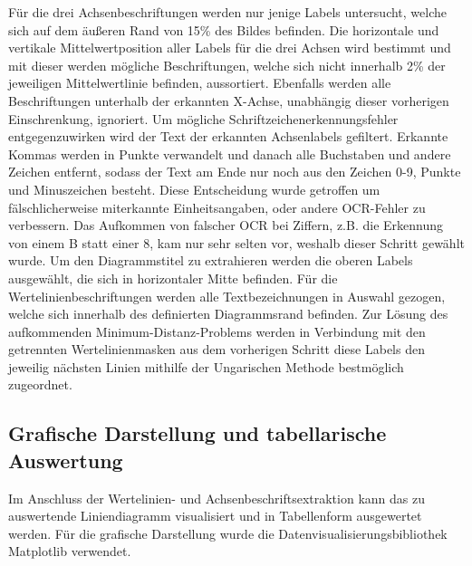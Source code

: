 Für die drei Achsenbeschriftungen werden nur jenige Labels untersucht, welche sich auf dem äußeren Rand von 15\% des Bildes befinden. Die horizontale und vertikale Mittelwertposition aller Labels für die drei Achsen wird bestimmt und mit dieser werden mögliche Beschriftungen, welche sich nicht innerhalb 2\% der jeweiligen Mittelwertlinie befinden, aussortiert. Ebenfalls werden alle Beschriftungen unterhalb der erkannten X-Achse, unabhängig dieser vorherigen Einschrenkung, ignoriert. Um mögliche Schriftzeichenerkennungsfehler entgegenzuwirken wird der Text der erkannten Achsenlabels gefiltert. Erkannte Kommas werden in Punkte verwandelt und danach alle Buchstaben und andere Zeichen entfernt, sodass der Text am Ende nur noch aus den Zeichen 0-9, Punkte und Minuszeichen besteht. Diese Entscheidung wurde getroffen um fälschlicherweise miterkannte Einheitsangaben, oder andere OCR-Fehler zu verbessern. Das Aufkommen von falscher OCR bei Ziffern, z.B. die Erkennung von einem B statt einer 8, kam nur sehr selten vor, weshalb dieser Schritt gewählt wurde.
Um den Diagrammstitel zu extrahieren werden die oberen Labels ausgewählt, die sich in horizontaler Mitte befinden. Für die Wertelinienbeschriftungen werden alle Textbezeichnungen in Auswahl gezogen, welche sich innerhalb des definierten Diagrammsrand befinden. Zur Lösung des aufkommenden Minimum-Distanz-Problems werden in Verbindung mit den getrennten Wertelinienmasken aus dem vorherigen Schritt diese Labels den jeweilig nächsten Linien mithilfe der Ungarischen Methode bestmöglich zugeordnet.
\clearpage
\subsection{Grafische Darstellung und tabellarische Auswertung}

Im Anschluss der Wertelinien- und Achsenbeschriftsextraktion kann das zu auswertende Liniendiagramm visualisiert und in Tabellenform ausgewertet werden. Für die grafische Darstellung wurde die Datenvisualisierungsbibliothek Matplotlib \cite{Hunter:2007} verwendet.

